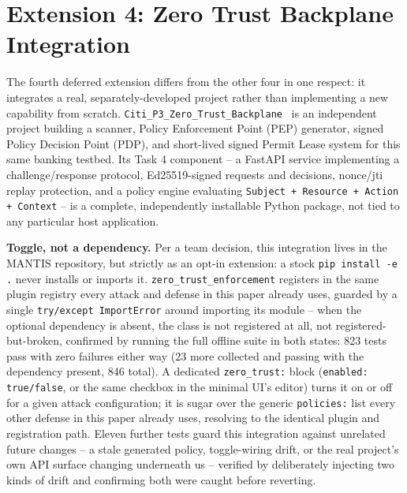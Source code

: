 \documentclass[conference]{IEEEtran}
\begin{document}
\section{Extension 4: Zero Trust Backplane Integration}

The fourth deferred extension differs from the other four in one respect: it integrates a real, separately-developed project rather than implementing a new capability from scratch. \texttt{Citi\_P3\_Zero\_Trust\_Backplane}~\cite{ztb_repo} is an independent project building a scanner, Policy Enforcement Point (PEP) generator, signed Policy Decision Point (PDP), and short-lived signed Permit Lease system for this same banking testbed. Its Task 4 component -- a FastAPI service implementing a challenge/response protocol, Ed25519-signed requests and decisions, nonce/jti replay protection, and a policy engine evaluating \texttt{Subject + Resource + Action + Context} -- is a complete, independently installable Python package, not tied to any particular host application.

\textbf{Toggle, not a dependency.} Per a team decision, this integration lives in the MANTIS repository, but strictly as an opt-in extension: a stock \texttt{pip install -e .} never installs or imports it. \texttt{zero\_trust\_enforcement} registers in the same plugin registry every attack and defense in this paper already uses, guarded by a single \texttt{try/except ImportError} around importing its module -- when the optional dependency is absent, the class is not registered at all, not registered-but-broken, confirmed by running the full offline suite in both states: 823 tests pass with zero failures either way (23 more collected and passing with the dependency present, 846 total). A dedicated \texttt{zero\_trust:} block (\texttt{enabled: true/false}, or the same checkbox in the minimal UI's editor) turns it on or off for a given attack configuration; it is sugar over the generic \texttt{policies:} list every other defense in this paper already uses, resolving to the identical plugin and registration path. Eleven further tests guard this integration against unrelated future changes -- a stale generated policy, toggle-wiring drift, or the real project's own API surface changing underneath us -- verified by deliberately injecting two kinds of drift and confirming both were caught before reverting.
\end{document}
